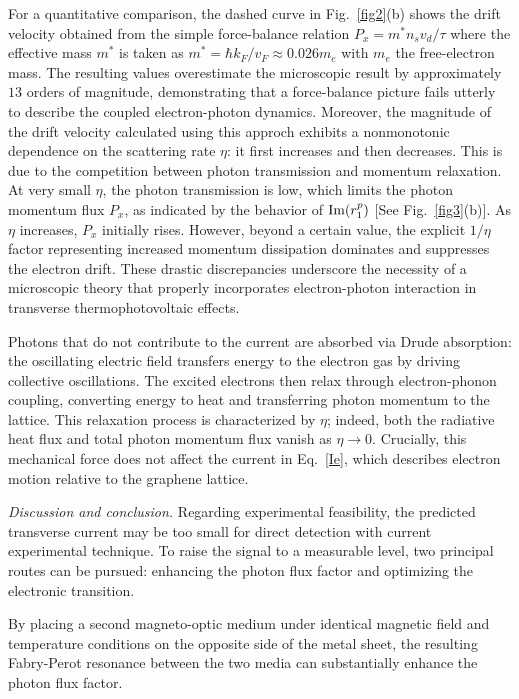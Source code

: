 \documentclass[aps,prl,twocolumn,longbibliography]{revtex4-2}
\begin{document}
For a quantitative comparison, the dashed curve in Fig.~\ref{fig2}(b) shows the drift
velocity obtained from the simple force-balance relation $P_x = m^* n_s v_d /\tau$
where the effective mass $m^*$ is taken as $m^* =\hbar k_F / v_F \approx 0.026m_e$
with $m_e$ the free-electron mass. The resulting values overestimate the microscopic
result by approximately $13$ orders of magnitude, demonstrating that a force-balance
picture fails utterly to describe the coupled electron-photon dynamics.
Moreover, the magnitude of the drift velocity calculated using this approch exhibits a
nonmonotonic dependence on the scattering rate $\eta$: it first increases and then
decreases. This is due to the competition between photon transmission and momentum
relaxation. At very small $\eta$, the photon transmission is low, which limits the photon
momentum flux $P_x$, as indicated by the behavior of ${\rm Im}(r_1^p)$ [See
Fig.~\ref{fig3}(b)].
As $\eta$ increases, $P_x$ initially rises. However, beyond a certain value, the explicit
$1/\eta$ factor representing increased momentum dissipation dominates and suppresses the
electron drift.
These drastic discrepancies underscore the necessity of a microscopic theory that properly
incorporates electron-photon interaction in transverse thermophotovoltaic effects.

Photons that do not contribute to the current are absorbed via Drude absorption: the
oscillating electric field transfers energy to the electron gas by driving collective
oscillations. The excited electrons then relax through electron-phonon coupling,
converting energy to heat and transferring photon momentum to the lattice. This relaxation
process is characterized by $\eta$; indeed, both the radiative heat flux and total
photon momentum flux vanish as $\eta \rightarrow 0$. Crucially, this mechanical force
does not affect the current in Eq.~\eqref{Ie}, which describes electron motion relative to
the graphene lattice.

{\it Discussion and conclusion.}
Regarding experimental feasibility, the predicted transverse current may be too small for
direct detection with current experimental technique. To raise the signal to a measurable
level, two principal routes can be pursued: enhancing the photon flux factor and
optimizing the electronic transition.

By placing a second magneto-optic medium under identical magnetic field and temperature
conditions on the opposite side of the metal sheet, the resulting Fabry-Perot resonance
between the two media can substantially enhance the photon flux factor.
\end{document}
